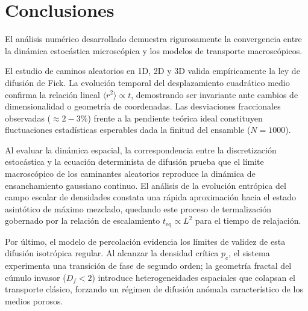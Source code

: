 \section{Conclusiones}

El análisis numérico desarrollado demuestra rigurosamente la convergencia entre la dinámica estocástica microscópica y los modelos de transporte macroscópicos.

El estudio de caminos aleatorios en 1D, 2D y 3D valida empíricamente la ley de difusión de Fick. La evolución temporal del desplazamiento cuadrático medio confirma la relación lineal $\langle r^2 \rangle \propto t$, demostrando ser invariante ante cambios de dimensionalidad o geometría de coordenadas. Las desviaciones fraccionales observadas ($\approx 2-3\%$) frente a la pendiente teórica ideal constituyen fluctuaciones estadísticas esperables dada la finitud del ensamble ($N=1000$).

Al evaluar la dinámica espacial, la correspondencia entre la discretización estocástica y la ecuación determinista de difusión prueba que el límite macroscópico de los caminantes aleatorios reproduce la dinámica de ensanchamiento gaussiano continuo. El análisis de la evolución entrópica del campo escalar de densidades constata una rápida aproximación hacia el estado asintótico de máximo mezclado, quedando este proceso de termalización gobernado por la relación de escalamiento $t_{\mathrm{eq}} \propto L^2$ para el tiempo de relajación.

Por último, el modelo de percolación evidencia los límites de validez de esta difusión isotrópica regular. Al alcanzar la densidad crítica $p_c$, el sistema experimenta una transición de fase de segundo orden; la geometría fractal del cúmulo invasor ($D_f < 2$) introduce heterogeneidades espaciales que colapsan el transporte clásico, forzando un régimen de difusión anómala característico de los medios porosos.